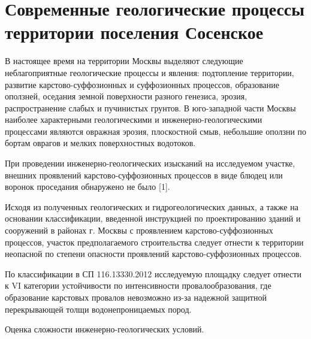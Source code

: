 \chapter{Современные геологические процессы территории поселения Сосенское}\label{ch:ch5}

В настоящее время на территории Москвы выделяют следующие неблагоприятные геологические процессы и явления: 
подтопление территории, развитие карстово-суффозионных и суффозионных процессов, образование оползней, 
оседания земной поверхности разного генезиса, эрозия, распространение слабых и пучинистых грунтов. 
В юго-западной части Москвы наиболее характерными геологическими и инженерно-геологическими процессами 
являются овражная эрозия, плоскостной смыв, небольшие оползни по бортам оврагов и мелких поверхностных водотоков.

При проведении инженерно-геологических изысканий на исследуемом участке, внешних проявлений карстово-суффозионных 
процессов в виде блюдец или воронок проседания обнаружено не было [1].

Исходя из полученных геологических и гидрогеологических данных, а также на основании классификации, 
введенной инструкцией по проектированию зданий и сооружений в районах г. Москвы с проявлением 
карстово-суффозионных процессов, участок предполагаемого строительства следует отнести к территории 
неопасной по степени опасности проявлений карстово-суффозионных процессов.

По классификации в СП 116.13330.2012 исследуемую площадку следует отнести к VI категории устойчивости 
по интенсивности провалообразования, где образование карстовых провалов невозможно 
из-за надежной защитной перекрывающей толщи водонепроницаемых пород.

Оценка сложности инженерно-геологических условий. 

